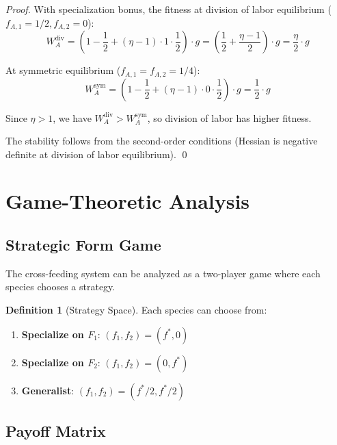 \documentclass[11pt]{article}
\theoremstyle{definition}
\newtheorem{definition}{Definition}
\theoremstyle{remark}
\begin{document}
\begin{proof}
With specialization bonus, the fitness at division of labor equilibrium ($f_{A,1} = 1/2, f_{A,2} = 0$):
\begin{equation}
W_A^{\text{div}} = \left(1 - \frac{1}{2} + (\eta - 1) \cdot 1 \cdot \frac{1}{2}\right) \cdot g = \left(\frac{1}{2} + \frac{\eta - 1}{2}\right) \cdot g = \frac{\eta}{2} \cdot g
\end{equation}

At symmetric equilibrium ($f_{A,1} = f_{A,2} = 1/4$):
\begin{equation}
W_A^{\text{sym}} = \left(1 - \frac{1}{2} + (\eta - 1) \cdot 0 \cdot \frac{1}{2}\right) \cdot g = \frac{1}{2} \cdot g
\end{equation}

Since $\eta > 1$, we have $W_A^{\text{div}} > W_A^{\text{sym}}$, so division of labor has higher fitness.

The stability follows from the second-order conditions (Hessian is negative definite at division of labor equilibrium). \qed
\end{proof}

\section{Game-Theoretic Analysis}

\subsection{Strategic Form Game}

The cross-feeding system can be analyzed as a two-player game where each species chooses a strategy.

\begin{definition}[Strategy Space]
Each species can choose from:
\begin{enumerate}
    \item \textbf{Specialize on $F_1$}: $(f_1, f_2) = (f^*, 0)$
    \item \textbf{Specialize on $F_2$}: $(f_1, f_2) = (0, f^*)$
    \item \textbf{Generalist}: $(f_1, f_2) = (f^*/2, f^*/2)$
\end{enumerate}
\end{definition}

\subsection{Payoff Matrix}
\end{document}
